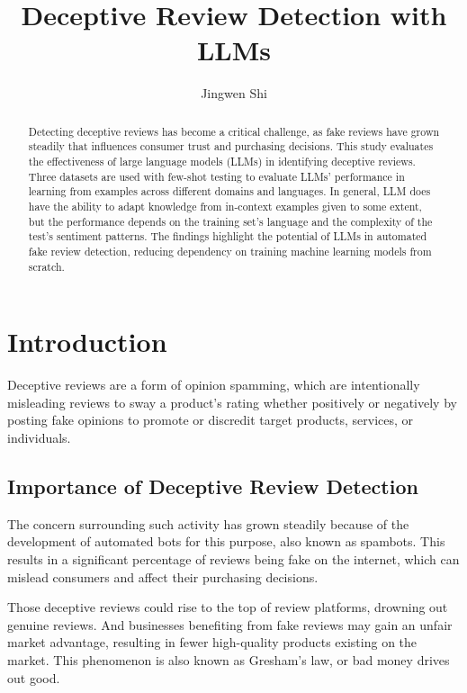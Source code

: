 \documentclass[sigconf, nonacm]{acmart}
\theoremstyle{definition}
\begin{document}
\title{Deceptive Review Detection with LLMs}

\author{Jingwen Shi}

\renewcommand{\shortauthors}{Jingwen Shi}

\begin{abstract}
  Detecting deceptive reviews has become a critical challenge, as fake reviews have grown steadily that influences consumer trust and purchasing decisions. This study evaluates the effectiveness of large language models (LLMs) in identifying deceptive reviews. Three datasets are used with few-shot testing to evaluate LLMs' performance in learning from examples across different domains and languages. In general, LLM does have the ability to adapt knowledge from in-context examples given to some extent, but the performance depends on the training set's language and the complexity of the test's sentiment patterns. The findings highlight the potential of LLMs in automated fake review detection, reducing dependency on training machine learning models from scratch.
\end{abstract}

\maketitle

\section{Introduction}
Deceptive reviews are a form of opinion spamming, which are intentionally misleading reviews to sway a product's rating whether positively or negatively by posting fake opinions to promote or discredit target products, services, or individuals.

\subsection{Importance of Deceptive Review Detection}
The concern surrounding such activity has grown steadily because of the development of automated bots for this purpose, also known as spambots. This results in a significant percentage of reviews being fake on the internet, which can mislead consumers and affect their purchasing decisions.

Those deceptive reviews could rise to the top of review platforms, drowning out genuine reviews. And businesses benefiting from fake reviews may gain an unfair market advantage, resulting in fewer high-quality products existing on the market. This phenomenon is also known as Gresham's law, or bad money drives out good.
\end{document}
